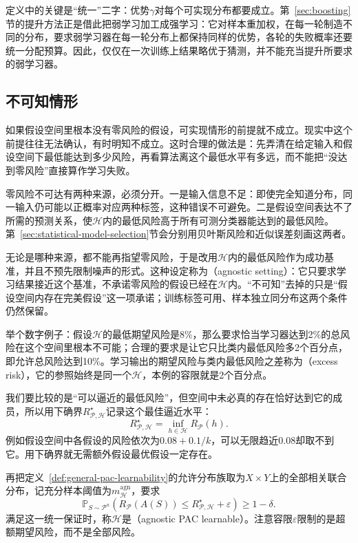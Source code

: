 定义中的关键是“统一”二字：优势$\gamma$对每个可实现分布都要成立。第~\ref{sec:boosting}节的提升方法正是借此把弱学习加工成强学习：它对样本重加权，在每一轮制造不同的分布，要求弱学习器在每一轮分布上都保持同样的优势，各轮的失败概率还要统一分配预算。因此，仅仅在一次训练上结果略优于猜测，并不能充当提升所要求的弱学习器。

\subsection{不可知情形}

如果假设空间里根本没有零风险的假设，可实现情形的前提就不成立。现实中这个前提往往无法确认，有时明知不成立。这时合理的做法是：先弄清在给定输入和假设空间下最低能达到多少风险，再看算法离这个最低水平有多远，而不能把“没达到零风险”直接算作学习失败。

零风险不可达有两种来源，必须分开。一是输入信息不足：即使完全知道分布，同一输入仍可能以正概率对应两种标签，这种错误不可避免。二是假设空间表达不了所需的预测关系，使$\mathcal H$内的最低风险高于所有可测分类器能达到的最低风险。第~\ref{sec:statistical-model-selection}节会分别用贝叶斯风险和近似误差刻画这两者。

无论是哪种来源，都不能再指望零风险，于是改用$\mathcal H$内的最低风险作为成功基准，并且不预先限制噪声的形式。这种设定称为（agnostic setting）：它只要求学习结果接近这个基准，不承诺零风险的假设已经在$\mathcal H$内。“不可知”去掉的只是“假设空间内存在完美假设”这一项承诺；训练标签可用、样本独立同分布这两个条件仍然保留。

举个数字例子：假设$\mathcal H$的最低期望风险是8\%，那么要求恰当学习器达到2\%的总风险在这个空间里根本不可能；合理的要求是让它只比类内最低风险多2个百分点，即允许总风险达到10\%。学习输出的期望风险与类内最低风险之差称为（excess risk），它的参照始终是同一个$\mathcal H$，本例的容限就是2个百分点。

我们要比较的是“可以逼近的最低风险”，但空间中未必真的存在恰好达到它的成员，所以用下确界$R_{\mathcal P,\mathcal H}^\star$记录这个最佳逼近水平：
\begin{equation}
 R_{\mathcal P,\mathcal H}^\star=\inf_{h\in\mathcal H}R_{\mathcal P}(h).
 \label{eq:best-in-class-risk}
\end{equation}
例如假设空间中各假设的风险依次为$0.08+0.1/k$，可以无限趋近0.08却取不到它。用下确界就无需额外假设最优假设一定存在。

再把定义~\ref{def:general-pac-learnability}的允许分布族取为$X\times Y$上的全部相关联合分布，记充分样本阈值为$m_{\mathcal H}^{\mathrm{agn}}$，要求
\begin{equation}
 \mathbb P_{S\sim\mathcal P^n}\left(
 R_{\mathcal P}(A(S))\leq R_{\mathcal P,\mathcal H}^\star+\varepsilon
 \right)\geq1-\delta.
 \label{eq:agnostic-pac-guarantee}
\end{equation}
满足这一统一保证时，称$\mathcal H$是（agnostic PAC learnable）。注意容限$\varepsilon$限制的是超额期望风险，而不是全部风险。


